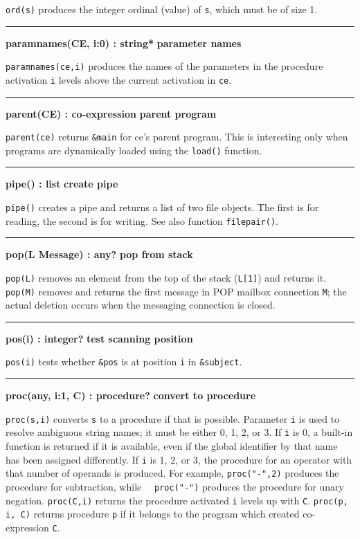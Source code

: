 \noindent
{}\texttt{ord(s)} produces the integer ordinal
(value) of \texttt{s}, which must be of size 1.

\bigskip\hrule\vspace{0.1cm}
\noindent
{\bf paramnames(CE, i:0) : string* } \hfill {\bf parameter names}

\noindent
{}\texttt{paramnames(ce,i)} produces the names of
the parameters in the procedure activation \texttt{i} levels above the
current activation in \texttt{ce}.

\bigskip\hrule\vspace{0.1cm}
\noindent
{\bf parent(CE) : co{}-expression } \hfill {\bf parent program}

\noindent
\texttt{parent(ce)} returns \texttt{\&main} for ce's
parent program. This is interesting only when programs are dynamically
loaded using the \texttt{load()} function.

\bigskip\hrule\vspace{0.1cm}
\noindent
{\bf pipe() : list } \hfill {\bf create pipe}

\noindent
{}\texttt{pipe()} creates a pipe and returns a list of two
file objects. The first is for reading, the second is for writing. See
also function \texttt{filepair()}.

\bigskip\hrule\vspace{0.1cm}
\noindent
{\bf pop(L {\textbar} Message) : any? } \hfill {\bf pop from stack}\WarningNotThreadSafe

\noindent
{}\texttt{pop(L)} removes an element from the top of the
stack (\texttt{L[1]}) and returns it. \texttt{pop(M)}
removes and returns the first message in POP mailbox connection \texttt{M};
the actual deletion occurs when the messaging connection is closed.

\bigskip\hrule\vspace{0.1cm}
\noindent
{\bf pos(i) : integer? } \hfill {\bf test scanning position}

\noindent
{}\texttt{pos(i)} tests whether \texttt{\&pos} is at
position \texttt{i} in \texttt{\&subject}.

\bigskip\hrule\vspace{0.1cm}
\noindent
{\bf proc(any, i:1, C) : procedure? } \hfill {\bf convert to procedure}

\noindent
{}\texttt{proc(s,i)} converts \texttt{s} to a procedure
if that is possible. Parameter \texttt{i} is used to resolve ambiguous
string names; it must be either 0, 1, 2, or 3. If \texttt{i} is 0, a
built-in function is returned if it is available, even if the global
identifier by that name has been assigned differently. If \texttt{i} is
1, 2, or 3, the procedure for an operator with that number of operands
is produced. For example,
\texttt{proc("-",2)} produces the procedure
for subtraction, while
\ \ \texttt{proc("-")} produces the
procedure for unary negation. \texttt{proc(C,i)} returns the procedure
activated \texttt{i} levels up with \texttt{C}. \texttt{proc(p, i, C)}
returns procedure \texttt{p} if it belongs to the program which created
co-expression \texttt{C}.

